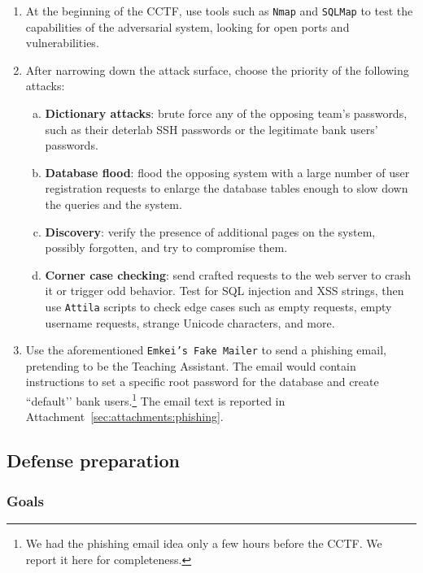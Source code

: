 \begin{enumerate}[1.]
    \item At the beginning of the CCTF, use tools such as \texttt{Nmap} and \texttt{SQLMap} to test the capabilities of the adversarial system, looking for open ports and vulnerabilities.
    \item After narrowing down the attack surface, choose the priority of the following attacks: \begin{enumerate}[a.]
        \item \textbf{Dictionary attacks}: brute force any of the opposing team's passwords, such as their deterlab SSH passwords or the legitimate bank users' passwords.
        \item \textbf{Database flood}: flood the opposing system with a large number of user registration requests to enlarge the database tables enough to slow down the queries and the system.
        \item \textbf{Discovery}: verify the presence of additional pages on the system, possibly forgotten, and try to compromise them.
        \item \textbf{Corner case checking}: send crafted requests to the web server to crash it or trigger odd behavior. Test for SQL injection and XSS strings, then use \texttt{Attila} scripts to check edge cases such as empty requests, empty username requests, strange Unicode characters, and more.
    \end{enumerate}
    \item Use the aforementioned \texttt{Emkei's Fake Mailer} to send a phishing email, pretending to be the Teaching Assistant. The email would contain instructions to set a specific root password for the database and create ``default’’ bank users.\footnote{We had the phishing email idea only a few hours before the CCTF. We report it here for completeness.} The email text is reported in Attachment~\ref{sec:attachments:phishing}.
\end{enumerate}

\subsection{Defense preparation}
\label{sec:cctf-secure:def-prep}


\subsubsection{Goals}
\label{sec:cctf-secure:def-prep:goals}


